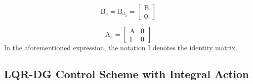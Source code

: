 \documentclass[3p,times]{elsarticle}
\begin{document}
\begin{equation}
	\boldsymbol{\mathrm{B_a}} = \boldsymbol{\mathrm{B_{{d_a}}}} = \begin{bmatrix}
		\boldsymbol{\mathrm{B}}\\
		\boldsymbol{0}
	\end{bmatrix}
\end{equation}

\begin{equation}
	\boldsymbol{\mathrm{A_a}} = \begin{bmatrix}
		\boldsymbol{\mathrm{A}} & \boldsymbol{0}\\
		\boldsymbol{\mathrm{I}} & \boldsymbol{0}
	\end{bmatrix}
\end{equation}
In the aforementioned expression, the notation $\boldsymbol{\mathrm{I}}$ denotes the identity matrix.

\subsection{LQR-DG Control Scheme with Integral Action}

\end{document}
